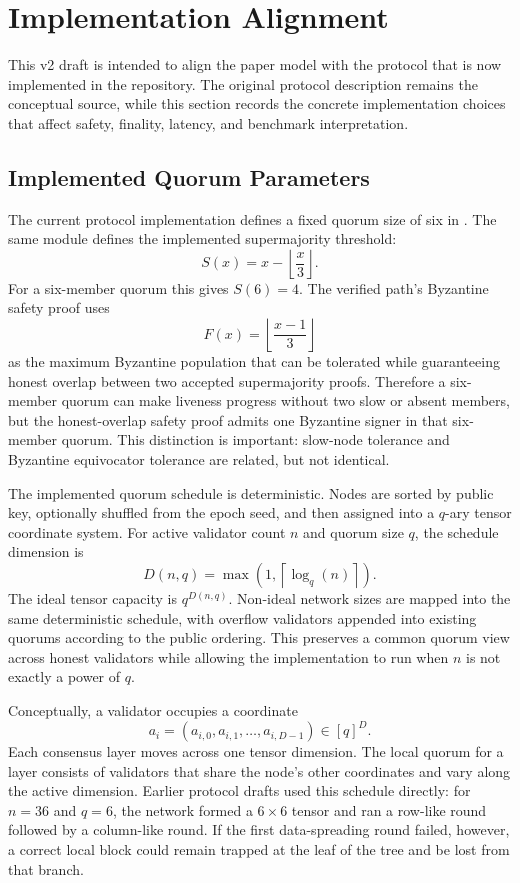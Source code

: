\section{Implementation Alignment}\label{impl:v2}

This v2 draft is intended to align the paper model with the protocol that is
now implemented in the repository. The original protocol description remains
the conceptual source, while this section records the concrete implementation
choices that affect safety, finality, latency, and benchmark interpretation.

\subsection{Implemented Quorum Parameters}

The current protocol implementation defines a fixed quorum size of six in
. The same module defines the implemented
supermajority threshold:
\[
S(x)=x-\left\lfloor \frac{x}{3}\right\rfloor .
\]
For a six-member quorum this gives \(S(6)=4\). The verified path's Byzantine
safety proof uses
\[
F(x)=\left\lfloor \frac{x-1}{3}\right\rfloor
\]
as the maximum Byzantine population that can be tolerated while guaranteeing
honest overlap between two accepted supermajority proofs. Therefore a
six-member quorum can make liveness progress without two slow or absent
members, but the honest-overlap safety proof admits one Byzantine signer in
that six-member quorum. This distinction is important: slow-node tolerance and
Byzantine equivocator tolerance are related, but not identical.

The implemented quorum schedule is deterministic. Nodes are sorted by public
key, optionally shuffled from the epoch seed, and then assigned into a
\(q\)-ary tensor coordinate system. For active validator count \(n\) and
quorum size \(q\), the schedule dimension is
\[
D(n,q)=\max \left(1,\left\lceil \log_q(n)\right\rceil\right).
\]
The ideal tensor capacity is \(q^{D(n,q)}\). Non-ideal network sizes are mapped
into the same deterministic schedule, with overflow validators appended into
existing quorums according to the public ordering. This preserves a common
quorum view across honest validators while allowing the implementation to run
when \(n\) is not exactly a power of \(q\).

Conceptually, a validator occupies a coordinate
\[
    a_i=(a_{i,0},a_{i,1},\ldots,a_{i,D-1}) \in [q]^D .
\]
Each consensus layer moves across one tensor dimension. The local quorum for a
layer consists of validators that share the node's other coordinates and vary
along the active dimension. Earlier protocol drafts used this schedule directly:
for \(n=36\) and \(q=6\), the network formed a \(6 \times 6\) tensor and ran a
row-like round followed by a column-like round. If the first data-spreading
round failed, however, a correct local block could remain trapped at the leaf
of the tree and be lost from that branch.

